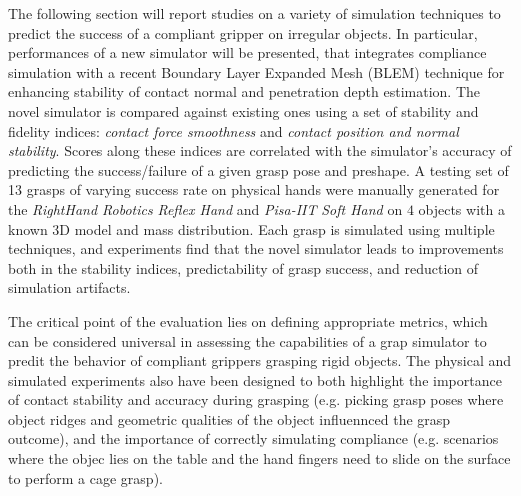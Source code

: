 The following section will report studies \cite{Rocchi2016-jq} on a variety of simulation techniques to predict the success of a compliant gripper on irregular objects.  In particular, performances of a new simulator will be presented, that integrates compliance simulation with a recent Boundary Layer Expanded Mesh (BLEM) technique for enhancing stability of contact normal and penetration depth estimation.
The novel simulator is compared against existing ones using a set of stability and fidelity indices: \emph{contact force smoothness} and \emph{contact position and normal stability}.
Scores along these indices are correlated with the simulator's accuracy of predicting the success/failure of a given grasp pose and preshape.  
A testing set of 13 grasps of varying success rate on physical hands were manually generated for the  \emph{RightHand Robotics} \emph{Reflex Hand} and \emph{Pisa-IIT} \emph{Soft Hand} on $4$ objects with a known 3D model and mass distribution. 
Each grasp is simulated using multiple techniques, and experiments find that the novel simulator leads to improvements both in the stability indices, predictability of grasp success, and reduction of simulation artifacts.

The critical point of the evaluation lies on defining appropriate metrics, which can be considered universal in assessing the capabilities of a grap simulator to predit the behavior of compliant grippers grasping rigid objects. The physical and simulated experiments also have been designed to both highlight the importance of contact stability and accuracy during grasping (e.g. picking grasp poses where object ridges and geometric qualities of the object influennced the grasp outcome), and the importance of correctly simulating compliance (e.g. scenarios where the objec lies on the table and the hand fingers need to slide on the surface to perform a cage grasp).

